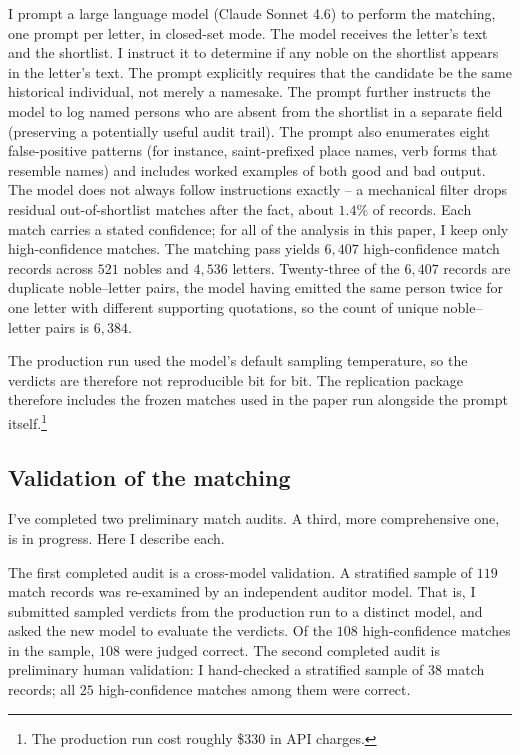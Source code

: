 \documentclass[12pt]{article}
\theoremstyle{definition}
\theoremstyle{remark}
\begin{document}
I prompt a large language model (Claude Sonnet 4.6) to perform the matching, one prompt per letter, in closed-set mode. The model receives the letter's text and the shortlist. I instruct it to determine if any noble on the shortlist appears in the letter's text. The prompt explicitly requires that the candidate be the same historical individual, not merely a namesake. The prompt further instructs the model to log named persons who are absent from the shortlist in a separate field (preserving a potentially useful audit trail). The prompt also enumerates eight false-positive patterns (for instance, saint-prefixed place names, verb forms that resemble names) and includes worked examples of both good and bad output. The model does not always follow instructions exactly -- a mechanical filter drops residual out-of-shortlist matches after the fact, about $1.4\%$ of records. Each match carries a stated confidence; for all of the analysis in this paper, I keep only high-confidence matches. The matching pass yields $6{,}407$ high-confidence match records across $521$ nobles and $4{,}536$ letters. Twenty-three of the $6{,}407$ records are duplicate noble--letter pairs, the model having emitted the same person twice for one letter with different supporting quotations, so the count of unique noble--letter pairs is $6{,}384$.

The production run used the model's default sampling temperature, so the verdicts are therefore not reproducible bit for bit. The replication package therefore includes the frozen matches used in the paper run alongside the prompt itself.\footnote{The production run cost roughly \$330 in API charges.}

\subsection{Validation of the matching}
\label{app:data-validation}

I've completed two preliminary match audits. A third, more comprehensive one, is in progress. Here I describe each.

The first completed audit is a cross-model validation. A stratified sample of $119$ match records was re-examined by an independent auditor model. That is, I submitted sampled verdicts from the production run to a distinct model, and asked the new model to evaluate the verdicts. Of the $108$ high-confidence matches in the sample, $108$ were judged correct. The second completed audit is preliminary human validation: I hand-checked a stratified sample of $38$ match records; all $25$ high-confidence matches among them were correct.
\end{document}
